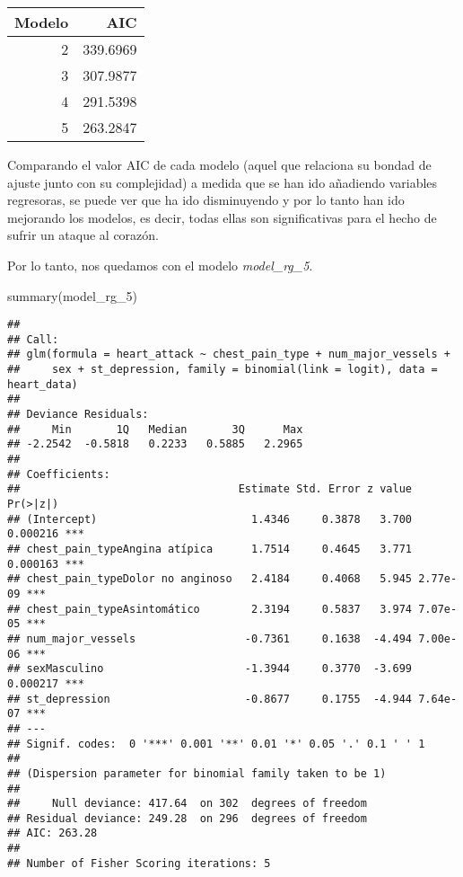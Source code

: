 \documentclass[
]{article}
\newenvironment{Shaded}{\begin{snugshade}}{\end{snugshade}}
\newcommand{\FunctionTok}[1]{\textcolor[rgb]{0.00,0.00,0.00}{#1}}
\newcommand{\NormalTok}[1]{#1}
\begin{document}
\begin{table}[!h]
\centering
\begin{tabular}{r|r}
\hline
Modelo & AIC\\
\hline
2 & 339.6969\\
\hline
3 & 307.9877\\
\hline
4 & 291.5398\\
\hline
5 & 263.2847\\
\hline
\end{tabular}
\end{table}

Comparando el valor AIC de cada modelo (aquel que relaciona su bondad de
ajuste junto con su complejidad) a medida que se han ido añadiendo
variables regresoras, se puede ver que ha ido disminuyendo y por lo
tanto han ido mejorando los modelos, es decir, todas ellas son
significativas para el hecho de sufrir un ataque al corazón.

Por lo tanto, nos quedamos con el modelo \emph{model\_rg\_5}.

\begin{Shaded}
\begin{Highlighting}[]
\FunctionTok{summary}\NormalTok{(model\_rg\_5)}
\end{Highlighting}
\end{Shaded}

\begin{verbatim}
## 
## Call:
## glm(formula = heart_attack ~ chest_pain_type + num_major_vessels + 
##     sex + st_depression, family = binomial(link = logit), data = heart_data)
## 
## Deviance Residuals: 
##     Min       1Q   Median       3Q      Max  
## -2.2542  -0.5818   0.2233   0.5885   2.2965  
## 
## Coefficients:
##                                  Estimate Std. Error z value Pr(>|z|)    
## (Intercept)                        1.4346     0.3878   3.700 0.000216 ***
## chest_pain_typeAngina atípica      1.7514     0.4645   3.771 0.000163 ***
## chest_pain_typeDolor no anginoso   2.4184     0.4068   5.945 2.77e-09 ***
## chest_pain_typeAsintomático        2.3194     0.5837   3.974 7.07e-05 ***
## num_major_vessels                 -0.7361     0.1638  -4.494 7.00e-06 ***
## sexMasculino                      -1.3944     0.3770  -3.699 0.000217 ***
## st_depression                     -0.8677     0.1755  -4.944 7.64e-07 ***
## ---
## Signif. codes:  0 '***' 0.001 '**' 0.01 '*' 0.05 '.' 0.1 ' ' 1
## 
## (Dispersion parameter for binomial family taken to be 1)
## 
##     Null deviance: 417.64  on 302  degrees of freedom
## Residual deviance: 249.28  on 296  degrees of freedom
## AIC: 263.28
## 
## Number of Fisher Scoring iterations: 5
\end{verbatim}
\end{document}
